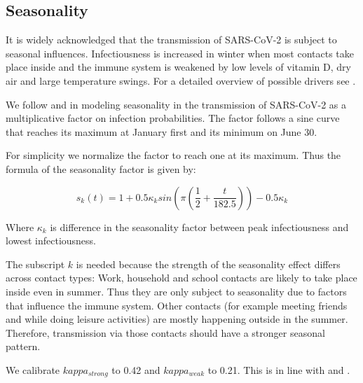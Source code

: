 \subsection{Seasonality}
\label{subsec:seasonality}

It is widely acknowledged that the transmission of SARS-CoV-2 is subject to seasonal
influences. Infectiousness is increased in winter when most contacts take place inside
and the immune system is weakened by low levels of vitamin D, dry air and large
temperature swings. For a detailed overview of possible drivers see
\cite{KronfeldSchor2021}.

We follow \cite{Kuehn2020} and \cite{Gavenciak2021} in modeling seasonality in the
transmission of SARS-CoV-2 as a multiplicative factor on infection probabilities. The
factor follows a sine curve that reaches its maximum at January first and its minimum
on June 30.

For simplicity we normalize the factor to reach one at its maximum. Thus the formula of
the seasonality factor is given by:

\begin{equation}
    s_k(t) = 1 + 0.5 \kappa_k  sin \left ( \pi  \left (\frac{1}{2} + \frac{t}{182.5}\right ) \right ) - 0.5 \kappa_k
\end{equation}

Where $\kappa_k$ is difference in the seasonality factor between peak infectiousness
and lowest infectiousness.

The subscript $k$ is needed because the strength of the seasonality effect differs
across contact types: Work, household and school contacts are likely to take place
inside even in summer. Thus they are only subject to seasonality due to factors that
influence the immune system. Other contacts (for example meeting friends and while doing
leisure activities) are mostly happening outside in the summer. Therefore, transmission
via those contacts should have a stronger seasonal pattern.

We calibrate $kappa_{strong}$ to 0.42 and $kappa_{weak}$ to 0.21. This is in line with
\cite{Gavenciak2021} and \cite{Kuehn2020}.
